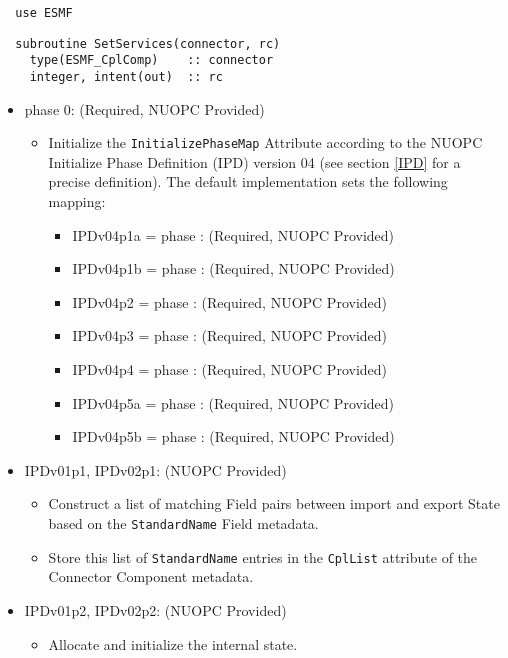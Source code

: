 \begin{verbatim}  use ESMF
\end{verbatim}

\begin{verbatim}  subroutine SetServices(connector, rc)
    type(ESMF_CplComp)    :: connector
    integer, intent(out)  :: rc
\end{verbatim}

\begin{itemize}
\item phase 0: ({\sc Required, NUOPC Provided})
  \begin{itemize}
  \item Initialize the {\tt InitializePhaseMap} Attribute according to the NUOPC Initialize Phase Definition (IPD) version 04 (see section \ref{IPD} for a precise definition). The default implementation sets the following mapping:
    \begin{itemize}
    \item IPDv04p1a = phase : ({\sc Required, NUOPC Provided})
    \item IPDv04p1b = phase : ({\sc Required, NUOPC Provided})
    \item IPDv04p2  = phase : ({\sc Required, NUOPC Provided})
    \item IPDv04p3  = phase : ({\sc Required, NUOPC Provided})
    \item IPDv04p4  = phase : ({\sc Required, NUOPC Provided})
    \item IPDv04p5a = phase : ({\sc Required, NUOPC Provided})
    \item IPDv04p5b = phase : ({\sc Required, NUOPC Provided})
    \end{itemize}  
  \end{itemize}  
\item IPDv01p1, IPDv02p1: ({\sc NUOPC Provided})
  \begin{itemize}
  \item Construct a list of matching Field pairs between import and export State based on the {\tt StandardName} Field metadata. 
  \item Store this list of {\tt StandardName} entries in the {\tt CplList} attribute of the Connector Component metadata.
  \end{itemize}
\item IPDv01p2, IPDv02p2: ({\sc NUOPC Provided})
  \begin{itemize}
  \item Allocate and initialize the internal state.

\end{itemize}
\end{itemize}
